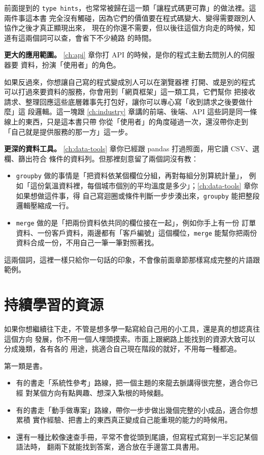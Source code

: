 前面提到的
\texttt{type hints}，也常常被歸在這一類「讓程式碼更可靠」的做法裡。這兩件事這本書
完全沒有觸碰，因為它們的價值要在程式碼變大、變得需要跟別人協作之後才真正顯現出來，
現在的你還不需要，但以後往這個方向走的時候，知道有這兩個詞可以查，會省下不少繞路
的時間。

\textbf{更大的應用範圍。} \ref{ch:api} 章你打 API 的時候，是你的程式主動去問別人的伺服器要
資料，扮演「使用者」的角色。

如果反過來，你想讓自己寫的程式變成別人可以在瀏覽器裡
打開、或是別的程式可以打過來要資料的服務，你會用到「網頁框架」這一類工具，它們幫你
把接收請求、整理回應這些底層雜事先打包好，讓你可以專心寫「收到請求之後要做什麼」這
段邏輯。這一塊跟 \ref{ch:industry} 章講的前端、後端、API 這些詞是同一條線上的東西，只是這本書只帶
你從「使用者」的角度碰過一次，還沒帶你走到「自己就是提供服務的那一方」這一步。

\textbf{更深的資料工具。} \ref{ch:data-tools} 章你已經跟 pandas 打過照面，用它讀 CSV、選欄、篩出符合
條件的資料列。但那裡刻意留了兩個詞沒有教：

\begin{itemize}
    \item \texttt{groupby} 做的事情是「把資料依某個欄位分組，再對每組分別算統計量」，
    例如「這份氣溫資料裡，每個城市個別的平均溫度是多少」；\ref{ch:data-tools} 章你如果想做這件事，得
    自己寫迴圈或條件判斷一步步湊出來，\texttt{groupby} 能把整段邏輯壓縮成一行。
    \item \texttt{merge} 做的是「把兩份資料依共同的欄位接在一起」，例如你手上有一份
    訂單資料、一份客戶資料，兩邊都有「客戶編號」這個欄位，\texttt{merge} 能幫你把兩份
    資料合成一份，不用自己一筆一筆對照著找。
\end{itemize}

這兩個詞，這裡一樣只給你一句話的印象，不會像前面章節那樣寫成完整的片語跟
範例。

\section{持續學習的資源}
\label{sec:learning-resources}

如果你想繼續往下走，不管是想多學一點寫給自己用的小工具，還是真的想認真往這個方向
發展，你不用一個人埋頭摸索。市面上跟網路上能找到的資源大致可以分成幾類，各有各的
用途，挑適合自己現在階段的就好，不用每一種都追。

第一類是書。

\begin{itemize}
    \item 有的書走「系統性參考」路線，把一個主題的來龍去脈講得很完整，適合你已經
    對某個方向有點興趣、想深入紮根的時候翻。
    \item 有的書走「動手做專案」路線，帶你一步步做出幾個完整的小成品，適合你想累積
    實作經驗、把書上的東西真正變成自己能重現的能力的時候用。
    \item 還有一種比較像速查手冊，平常不會從頭到尾讀，但寫程式寫到一半忘記某個語法時，
    翻兩下就能找到答案，適合放在手邊當工具書用。
\end{itemize}

